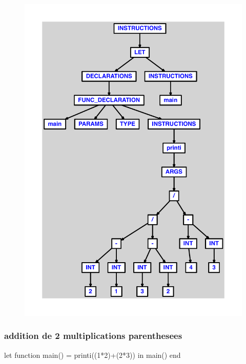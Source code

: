 \documentclass{article}
\begin{document}
\begin{figure}[H]\centering\includegraphics[max width=\textwidth]{ast/ast_106.pdf}\end{figure}\subsubsection{addition de 2 multiplications parenthesees}
\begin{verbatimtab}
let function main() = printi((1*2)+(2*3)) in main() end
\end{verbatimtab}
\end{document}
